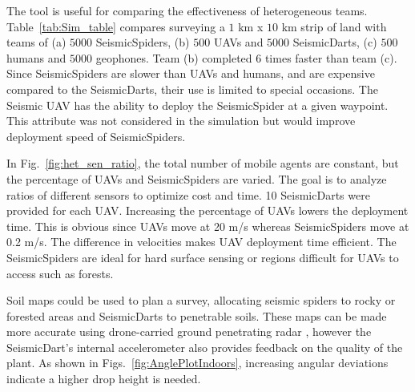 The tool is useful for comparing the effectiveness of heterogeneous teams.  Table~\ref{tab:Sim_table} compares surveying a $1$ km x $10$ km strip of land with teams of (a) $5000$ SeismicSpiders, (b) $500$ UAVs and $5000$ SeismicDarts, (c) $500$ humans and $5000$ geophones.  Team (b) completed $6$ times faster than team (c). 
  Since SeismicSpiders are  slower than UAVs and humans, and are expensive compared to the SeismicDarts, their use is limited to special occasions. The Seismic UAV has the ability to deploy the SeismicSpider at a given waypoint. This attribute was not considered in the simulation but would improve deployment speed of SeismicSpiders.
   
In Fig.~\ref{fig:het_sen_ratio}, the total number of mobile agents are constant, but the percentage of UAVs and SeismicSpiders are varied. The goal is to analyze ratios of different sensors to optimize cost and time. 10 SeismicDarts were provided for each UAV. Increasing the percentage of UAVs lowers the deployment time. This is obvious since UAVs move at 20 m/s whereas SeismicSpiders move at 0.2 m/s. The difference in velocities makes UAV deployment time efficient. The SeismicSpiders are ideal for hard surface sensing or regions difficult for UAVs to access such as  forests.

Soil maps could be used to plan a survey, allocating seismic spiders to rocky or forested areas and SeismicDarts to penetrable soils. 
These maps can be made more accurate using drone-carried ground penetrating radar \cite{merz2015new}, however the  SeismicDart's internal accelerometer also provides feedback on the quality of the plant. As shown in Figs.~\ref{fig:AnglePlotIndoors}, increasing angular deviations indicate a higher drop height is needed.  







